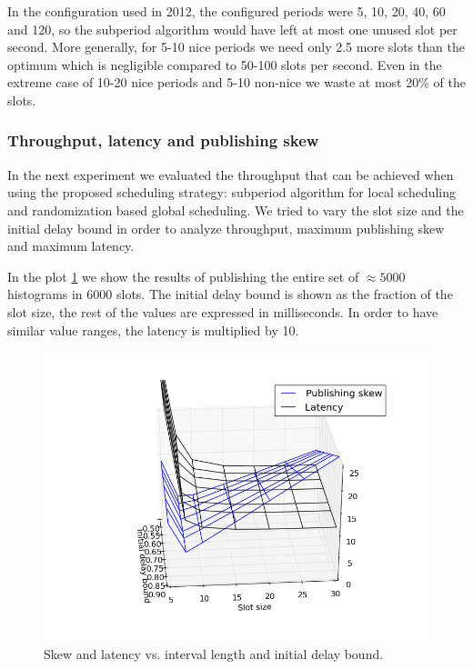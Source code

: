 In the configuration used in 2012, the configured periods were 5, 10, 20, 40, 60 and 120, so the subperiod algorithm would have left at most one unused slot per second. More generally, for 5-10 nice periods we need only 2.5 more slots than the optimum which is negligible compared to 50-100 slots per second. Even in the extreme case of 10-20 nice periods and 5-10 non-nice we waste at most 20\% of the slots.

\subsubsection*{Throughput, latency and publishing skew}

In the next experiment we evaluated the throughput that can be achieved when using the proposed scheduling strategy: subperiod algorithm for local scheduling and randomization based global scheduling. We tried to vary the slot size and the initial delay bound in order to analyze throughput, maximum publishing skew and maximum latency. 

In the plot \ref{fig:skew_lat_sim} we show the results of publishing the entire set of $\approx 5000$ histograms in $6000$ slots. The initial delay bound is shown as the fraction of the slot size, the rest of the values are expressed in milliseconds. In order to have similar value ranges, the latency is multiplied by 10.

\begin{figure}[ht]
\centering
\includegraphics[scale=0.7]{Images/skew_lat_sim.png}
\caption{Skew and latency vs. interval length and initial delay bound.}
\label{fig:skew_lat_sim}
\end{figure}

